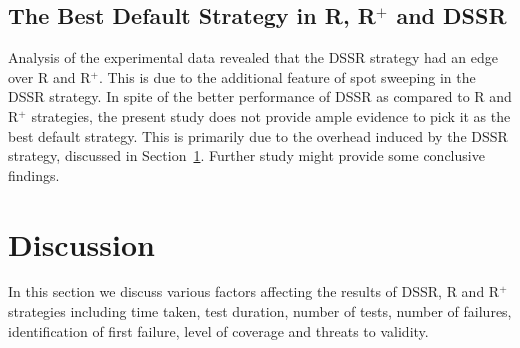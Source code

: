 


\subsection{The Best Default Strategy in R, R$^+$ and DSSR}

Analysis of the experimental data revealed that the DSSR strategy had an edge over R and R$^+$. This is due to the additional feature of spot sweeping in the DSSR strategy. In spite of the better performance of DSSR as compared to R and R$^+$ strategies, the present study does not provide ample evidence to pick it as the best default strategy. This is primarily due to the overhead induced by the DSSR strategy, discussed in Section~\ref{sec:discussion3}. Further study might provide some conclusive findings. 





\section{Discussion}\label{sec:discussion3}
In this section we discuss various factors affecting the results of DSSR, R and R$^+$ strategies including time taken, test duration, number of tests, number of failures, identification of first failure, level of coverage and threats to validity.

